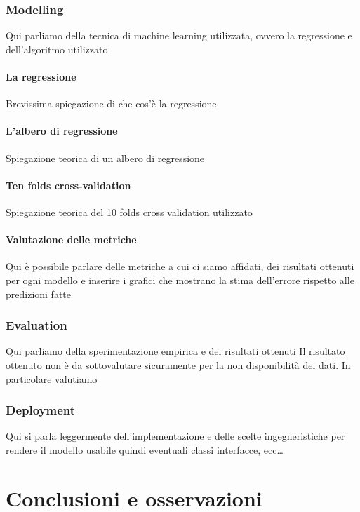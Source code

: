 \documentclass[a4paper, 11pt, oneside]{report}
\begin{document}
            \section{Modelling}
            Qui parliamo della tecnica di machine learning utilizzata, ovvero la regressione e dell'algoritmo utilizzato
                \subsection{La regressione}
                Brevissima spiegazione di che cos'è la regressione
                \subsection{L'albero di regressione}
                Spiegazione teorica di un albero di regressione
                \subsection{Ten folds cross-validation}
                Spiegazione teorica del 10 folds cross validation utilizzato
                \subsection{Valutazione delle metriche}
                Qui è possibile parlare delle metriche a cui ci siamo affidati, dei risultati ottenuti per ogni modello
                e inserire i grafici che mostrano la stima dell'errore rispetto alle predizioni fatte

            \section{Evaluation}
            Qui parliamo della sperimentazione empirica e dei risultati ottenuti
            Il risultato ottenuto non è da sottovalutare sicuramente per la non disponibilità dei dati.
            In particolare valutiamo

            \section{Deployment}
            Qui si parla leggermente dell'implementazione e delle scelte ingegneristiche per rendere il modello usabile
            quindi eventuali classi interfacce, ecc\ldots


    \part{Conclusioni e osservazioni}
\end{document}
